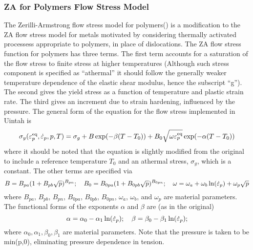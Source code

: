   \subsubsection{ZA for Polymers Flow Stress Model}
  The Zerilli-Armstrong flow stress model for polymers(\cite{Zerilli2007})
  is a modification to the ZA flow stress model for metals motivated by considering
  thermally activated processess appropriate to polymers, in place of
  dislocations.  The ZA flow stress function for polymers has three terms.  
  The first term accounts for a saturation of the flow stress to finite stress 
  at higher temperatures (Although such stress component is specified as ``athermal'' 
  it should follow the generally weaker temperature dependence of the elastic 
  shear modulus, hence the subscript ``g''). The second gives the yield stress as 
  a function of temperature and plastic strain rate. The third gives an increment 
  due to strain hardening, influenced by the pressure. The general form of the
  equation for the flow stress implemented in Uintah is
  \begin{equation}
    \sigma_y(\varepsilon_p^\text{eq},\dot{\varepsilon}_{p},p,T) = 
      \sigma_g + B\exp(-\beta(T-T_0)) + 
                           B_0\sqrt{\omega\varepsilon_p^\text{eq}}\exp(-\alpha(T-T_0))
  \end{equation}
  where it should be noted that the equation is slightly modified from the
  original to include a reference temperature $T_0$ and an athermal stress, 
  $\sigma_g$, which is a constant.  The other terms are specified via
  \begin{equation}
    B=B_{pa}(1+B_{pb}\sqrt{p})^{B_{pn}};\quad
    B_0=B_{0pa}(1+B_{0pb}\sqrt{p})^{B_{0pn}};\quad
    \omega=\omega_a+\omega_b\ln(\dot{\varepsilon}_{p})+\omega_p \sqrt{p}
  \end{equation}
  where $B_{pa}$, $B_{pb}$, $B_{pn}$, $B_{0pa}$, $B_{0pb}$, $B_{0pn}$, $\omega_a$, $\omega_b$, 
  and $\omega_p$ are material parameters.  The functional forms of the exponents
  $\alpha$ and $\beta$ are (as in the original)
  \begin{equation}
    \alpha = \alpha_0 - \alpha_1 \ln(\dot{\varepsilon}_{p}); \quad
    \beta = \beta_0 - \beta_1 \ln(\dot{\varepsilon}_{p}); 
  \end{equation}
  where $\alpha_0, \alpha_1, \beta_0, \beta_1$ are material parameters.  Note that the
  pressure is taken to be min(p,0), eliminating pressure dependence in tension.

